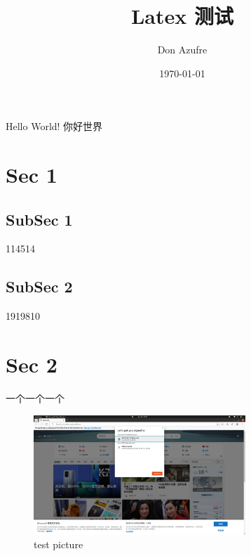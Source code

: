 \documentclass[12pt, a4paper, oneside]{ctexart}
\title{Latex 测试}
\author{Don Azufre}
\date{\today}
\begin{document}
	\maketitle
	\tableofcontents
	Hello World!
	你好世界
	\section{Sec 1}
	\subsection{SubSec 1}
	114514
	\subsection{SubSec 2}
	1919810
	\section{Sec 2}
	一个一个一个
	\begin{figure}[htbp]
		\centering
		\includegraphics[width=8cm]{t.png}
		\caption{test picture}
	\end{figure}
\end{document}
